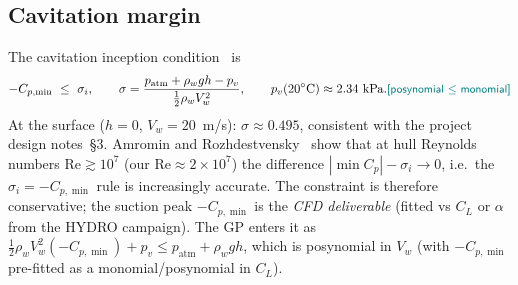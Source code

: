 \documentclass{new-aiaa}
\newcommand{\gpc}[1]{\textcolor{teal}{\small\textsf{[#1]}}} %
\begin{document}
\subsection{Cavitation margin}\label{sec:cavitation}
The cavitation inception condition~\cite{brennen2014cavitation} is
\begin{equation}
-C_{p,\min}\ \le\ \sigma_i,
\qquad \sigma = \frac{p_{\text{atm}} + \rho_w g h - p_v}{\tfrac12\rho_w V_w^2},
\qquad p_v(20^\circ\text{C})\approx 2.34\ \text{kPa}.
\gpc{posynomial $\le$ monomial}
\end{equation}
At the surface ($h=0$, $V_w=20$~m/s): $\sigma\approx0.495$, consistent with
the project design notes~\S3. Amromin and Rozhdestvensky~\cite{amromin2022cavitation} show that at hull Reynolds
numbers $\mathrm{Re}\gtrsim10^7$ (our $\mathrm{Re}\approx2\times10^7$) the difference
$|\min C_p|-\sigma_i\to0$, i.e.\ the $\sigma_i=-C_{p,\min}$ rule is increasingly accurate. The
constraint is therefore conservative; the suction peak $-C_{p,\min}$ is the \emph{CFD deliverable}
(fitted vs $C_L$ or $\alpha$ from the HYDRO campaign). The GP enters it as
$\tfrac12\rho_w V_w^2(-C_{p,\min})+p_v\le p_{\text{atm}}+\rho_w g h$, which is posynomial in $V_w$
(with $-C_{p,\min}$ pre-fitted as a monomial/posynomial in $C_L$).
\end{document}
